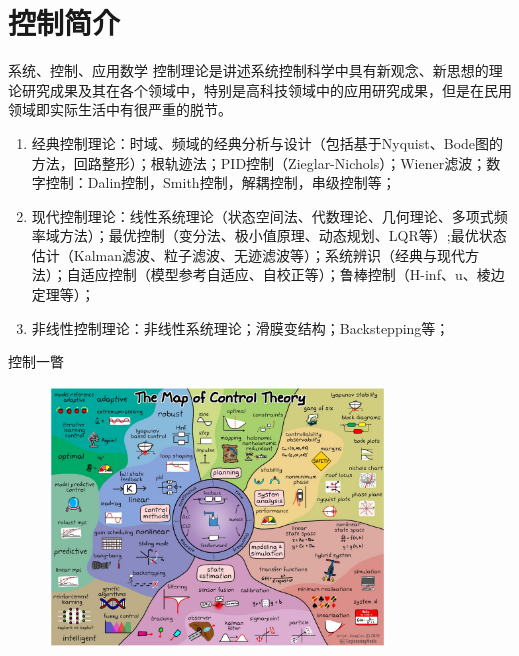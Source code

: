 \documentclass[10pt]{ctexbeamer}
\begin{document}
\section{控制简介}

\begin{frame}{系统、控制、应用数学}
  控制理论是讲述系统控制科学中具有新观念、新思想的理论研究成果及其在各个领域中，特别是高科技领域中的应用研究成果，但是在民用领域即实际生活中有很严重的脱节。
\end{frame}

\begin{frame}{}
  \begin{enumerate}
    \item 经典控制理论：时域、频域的经典分析与设计（包括基于Nyquist、Bode图的方法，回路整形）；根轨迹法；PID控制（Zieglar-Nichols）；Wiener滤波；数字控制：Dalin控制，Smith控制，解耦控制，串级控制等；
    \item 现代控制理论：线性系统理论（状态空间法、代数理论、几何理论、多项式频率域方法）；最优控制（变分法、极小值原理、动态规划、LQR等）;最优状态估计（Kalman滤波、粒子滤波、无迹滤波等）；系统辨识（经典与现代方法）；自适应控制（模型参考自适应、自校正等）；鲁棒控制（H-inf、u、棱边定理等）；
    \item 非线性控制理论：非线性系统理论；滑膜变结构；Backstepping等；
  \end{enumerate}
\end{frame}

\begin{frame}{控制一瞥}
  \begin{figure}
    \includegraphics[width=0.8\textwidth]{pic/map_of_control.jpeg}
  \end{figure}
\end{frame}
\end{document}
